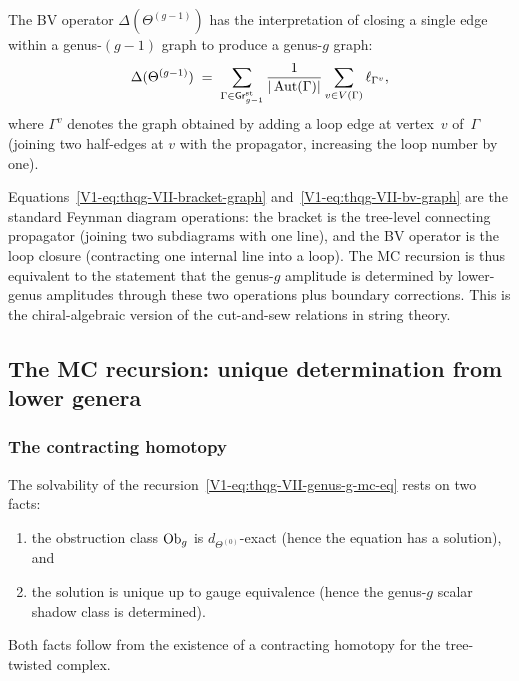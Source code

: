 The BV operator $\Delta(\Theta^{(g-1)})$ has the interpretation
of closing a single edge within a genus-$(g{-}1)$ graph to
produce a genus-$g$ graph:
\begin{equation}%
\Delta(\Theta^{(g-1)})
\;=\;
\sum_{\Gamma \in \mathsf{Gr}_{g-1}^{\mathrm{st}}}
\frac{1}{|\Aut(\Gamma)|}
\sum_{v \in V(\Gamma)}
\ell_{\Gamma^v},
\end{equation}
where $\Gamma^v$ denotes the graph obtained by adding a loop edge
at vertex~$v$ of~$\Gamma$ (joining two half-edges at $v$ with
the propagator, increasing the loop number by one).

\begin{remark}
Equations~\eqref{V1-eq:thqg-VII-bracket-graph}
and~\eqref{V1-eq:thqg-VII-bv-graph} are the standard Feynman
diagram operations: the bracket is the tree-level connecting
propagator (joining two subdiagrams with one line), and the BV
operator is the loop closure (contracting one internal line into
a loop). The MC recursion is thus equivalent to the statement
that the genus-$g$ amplitude is determined by lower-genus
amplitudes through these two operations plus boundary corrections.
This is the chiral-algebraic version of the cut-and-sew relations
in string theory.
\end{remark}

%
%

\subsection{The MC recursion: unique determination from lower genera}

\subsubsection{The contracting homotopy}

The solvability of the recursion~\eqref{V1-eq:thqg-VII-genus-g-mc-eq}
rests on two facts:
\begin{enumerate}[label=(\alph*)]
\item the obstruction class $\mathrm{Ob}_g$ is
 $d_{\Theta^{(0)}}$-exact (hence the equation has a
 solution), and
\item the solution is unique up to gauge equivalence
 (hence the genus-$g$ scalar shadow class is determined).
\end{enumerate}
Both facts follow from the existence of a contracting homotopy
for the tree-twisted complex.

